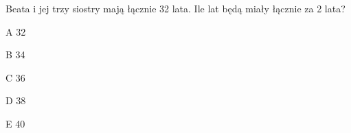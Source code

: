 \begin{tresc}
Beata i jej trzy siostry mają łącznie 32 lata. Ile lat będą miały łącznie za 2 lata?
\end{tresc}
\begin{wariant}{A} 32 \end{wariant}
\begin{wariant}{B} 34 \end{wariant}
\begin{wariant}{C} 36 \end{wariant}
\begin{wariant}{D} 38 \end{wariant}
\begin{wariant}{E} 40 \end{wariant}
